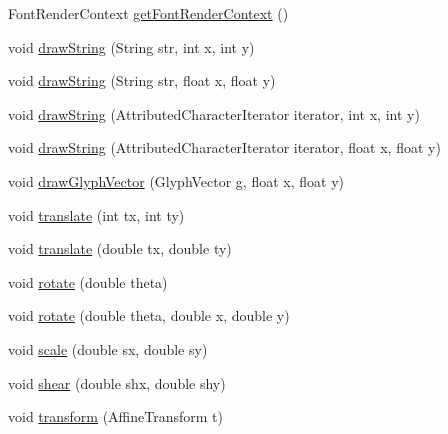 \begin{DoxyCompactItemize}
\item 
Font\+Render\+Context \mbox{\hyperlink{classorg_1_1jfree_1_1chart_1_1fx_1_1_f_x_graphics2_d_a6fa99057b015d895c6f26e3177dbb94e}{get\+Font\+Render\+Context}} ()
\item 
void \mbox{\hyperlink{classorg_1_1jfree_1_1chart_1_1fx_1_1_f_x_graphics2_d_a03a3c0d6793ee39bf3e3ca6269cd84a2}{draw\+String}} (String str, int x, int y)
\item 
void \mbox{\hyperlink{classorg_1_1jfree_1_1chart_1_1fx_1_1_f_x_graphics2_d_a7290c96d5c84d303ddc9b33777bfd936}{draw\+String}} (String str, float x, float y)
\item 
void \mbox{\hyperlink{classorg_1_1jfree_1_1chart_1_1fx_1_1_f_x_graphics2_d_a5f0bdf3c4445fc17b65b2eeec9e3e0f4}{draw\+String}} (Attributed\+Character\+Iterator iterator, int x, int y)
\item 
void \mbox{\hyperlink{classorg_1_1jfree_1_1chart_1_1fx_1_1_f_x_graphics2_d_a1ee6ccd9c051742dc341875af65eb755}{draw\+String}} (Attributed\+Character\+Iterator iterator, float x, float y)
\item 
void \mbox{\hyperlink{classorg_1_1jfree_1_1chart_1_1fx_1_1_f_x_graphics2_d_a09c47a6f03924738388ffe71baa69c72}{draw\+Glyph\+Vector}} (Glyph\+Vector g, float x, float y)
\item 
void \mbox{\hyperlink{classorg_1_1jfree_1_1chart_1_1fx_1_1_f_x_graphics2_d_a43b6cee98e356c04c4c3ce1e3c9e43f8}{translate}} (int tx, int ty)
\item 
void \mbox{\hyperlink{classorg_1_1jfree_1_1chart_1_1fx_1_1_f_x_graphics2_d_ad554b156d4cb31cb2700f41612b23514}{translate}} (double tx, double ty)
\item 
void \mbox{\hyperlink{classorg_1_1jfree_1_1chart_1_1fx_1_1_f_x_graphics2_d_abd43eee46f985f7120d20132c30f5f33}{rotate}} (double theta)
\item 
void \mbox{\hyperlink{classorg_1_1jfree_1_1chart_1_1fx_1_1_f_x_graphics2_d_ab32ebfd6d3779ed417954623b777f434}{rotate}} (double theta, double x, double y)
\item 
void \mbox{\hyperlink{classorg_1_1jfree_1_1chart_1_1fx_1_1_f_x_graphics2_d_a68e4a05a5758bbd1a9f5ce0511d3e8ab}{scale}} (double sx, double sy)
\item 
void \mbox{\hyperlink{classorg_1_1jfree_1_1chart_1_1fx_1_1_f_x_graphics2_d_acddd0092045f44b40877489c00155c94}{shear}} (double shx, double shy)
\item 
void \mbox{\hyperlink{classorg_1_1jfree_1_1chart_1_1fx_1_1_f_x_graphics2_d_a5f8780018ed5e23b402677ab14883552}{transform}} (Affine\+Transform t)

\end{DoxyCompactItemize}
